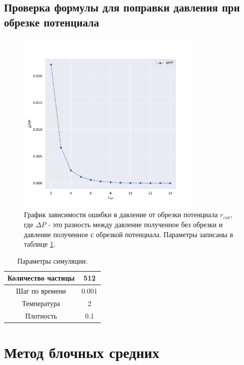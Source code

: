 \documentclass[a4paper,12pt]{article}
\begin{document}
\subsection{Проверка формулы для поправки давления 
при обрезке потенциала}

\begin{figure}[H]
    \centering
    \includegraphics[width=0.8\textwidth]{../../media/rcut.pdf}
    \caption{График зависимости ошибки в давление от обрезки
    потенциала \(r_{cut}\), где \(\Delta P\) - это разность 
между давление полученное без обрезки и давление полученное 
с обрезкой потенциала. 
Параметры записаны в таблице \ref{tab2}.}
    \label{fig-rcut}
\end{figure}

\begin{table}[H]
    \centering
    \caption{Параметры симуляции.}
    \label{tab2}
    \begin{tabular}{| c | c |}
        \hline
        Количество частицы & 512 \\
        \hline
        Шаг по времени & 0.001 \\
        \hline
        Температура & 2 \\
        \hline
        Плотность & 0.1 \\
        \hline
    \end{tabular}
\end{table}

\section{Метод блочных средних}
\end{document}
